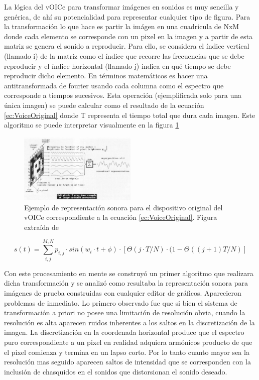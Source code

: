 \documentclass{article}
\numberwithin{figure}{section}
\begin{document}
    La lógica del vOICe para transformar imágenes en sonidos es muy sencilla y genérica, de ahí su potencialidad para representar cualquier tipo de figura. Para la transformación lo que hace es partir la imágen en una cuadricula de NxM donde cada elemento se corresponde con un pixel en la imagen y a partir de esta matriz se genera el sonido a reproducir. Para ello, se considera el índice vertical (llamado i) de la matriz como el índice que recorre las frecuencias que se debe reproducir y el índice horizontal (llamado j) indica en qué tiempo se debe reproducir dicho elemento. En términos matemáticos es hacer una antitransformada de fourier usando cada columna como el espectro que corresponde a tiempos sucesivos. Esta operación (ejemplificada solo para una única imagen) se puede calcular como el resultado de la ecuación \ref{ec:VoiceOriginal} donde T representa el tiempo total que dura cada imagen. Este algoritmo se puede interpretar visualmente en la figura \ref{fig:VoiceOriginal}
    
    \begin{figure}
        \center
        \includegraphics[width=0.5\textwidth]{Imagenes/VoiceOriginal.png}
        \caption{Ejemplo de representación sonora para el dispositivo original del vOICe correspondiente a la ecuación \ref{ec:VoiceOriginal}. Figura extraída de \cite{Voice1}}
        \label{fig:VoiceOriginal}
    \end{figure}
    
    \begin{equation}
        \label{ec:VoiceOriginal}
        s(t) = \sum_{i,j}^{M,N} p_{i,j} \cdot sin(w_i \cdot t + \phi) \cdot [\Theta(j \cdot T/N) \cdot (1-\Theta((j+1)T/N)]
    \end{equation}

    Con este procesamiento en mente se construyó un primer algoritmo que realizara dicha transformación y se analizó como resultaba la representación sonora para imágenes de prueba construidas con cualquier editor de gráficos. Aparecieron problemas de inmediato. Lo primero observado fue que si bien el sistema de transformación a priori no posee una limitación de resolución obvia, cuando la resolución es alta aparecen ruidos inherentes a los saltos en la discretización de la imagen. La discretización en la coordenada horizontal produce que el espectro puro correspondiente a un pixel en realidad adquiera armónicos producto de que el pixel comienza y termina en un lapso corto. Por lo tanto cuanto mayor sea la resolución mas seguido aparecen saltos de intensidad que se corresponden con la inclusión de chasquidos en el sonidos que distorsionan el sonido deseado. 
    
\end{document}
